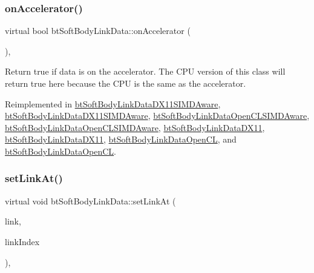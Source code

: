 \subsubsection{\texorpdfstring{on\+Accelerator()}{onAccelerator()}\hspace{0.1cm}{\footnotesize\ttfamily [2/2]}}
{\footnotesize\ttfamily virtual bool bt\+Soft\+Body\+Link\+Data\+::on\+Accelerator (\begin{DoxyParamCaption}{ }\end{DoxyParamCaption})\hspace{0.3cm}{\ttfamily [inline]}, {\ttfamily [virtual]}}

Return true if data is on the accelerator. The C\+PU version of this class will return true here because the C\+PU is the same as the accelerator. 

Reimplemented in \hyperlink{classbtSoftBodyLinkDataDX11SIMDAware_acc8a4475c093d0caf3da6e104ad33f5d}{bt\+Soft\+Body\+Link\+Data\+D\+X11\+S\+I\+M\+D\+Aware}, \hyperlink{classbtSoftBodyLinkDataDX11SIMDAware_a3e740fcbea59c3d0b79f27df3fe8c40d}{bt\+Soft\+Body\+Link\+Data\+D\+X11\+S\+I\+M\+D\+Aware}, \hyperlink{classbtSoftBodyLinkDataOpenCLSIMDAware_a5016c89bbdf9c87283c138d629f34601}{bt\+Soft\+Body\+Link\+Data\+Open\+C\+L\+S\+I\+M\+D\+Aware}, \hyperlink{classbtSoftBodyLinkDataOpenCLSIMDAware_a0b6e6e7c88ca01fcb83160bfec42ecbe}{bt\+Soft\+Body\+Link\+Data\+Open\+C\+L\+S\+I\+M\+D\+Aware}, \hyperlink{classbtSoftBodyLinkDataDX11_a3138e6cb78bf8dac4786a3c45b26d5b8}{bt\+Soft\+Body\+Link\+Data\+D\+X11}, \hyperlink{classbtSoftBodyLinkDataDX11_a97835c62006c461555d41c61af626f17}{bt\+Soft\+Body\+Link\+Data\+D\+X11}, \hyperlink{classbtSoftBodyLinkDataOpenCL_a3e97987329d5a5e7a4a51523fa9d4651}{bt\+Soft\+Body\+Link\+Data\+Open\+CL}, and \hyperlink{classbtSoftBodyLinkDataOpenCL_a6cd4ec2a4127d48feff5c2cb46be5d52}{bt\+Soft\+Body\+Link\+Data\+Open\+CL}.

\mbox{\label{classbtSoftBodyLinkData_a44f200dcb878405cebf3704dc7a8b8cd}} 
\subsubsection{\texorpdfstring{set\+Link\+At()}{setLinkAt()}\hspace{0.1cm}{\footnotesize\ttfamily [1/2]}}
{\footnotesize\ttfamily virtual void bt\+Soft\+Body\+Link\+Data\+::set\+Link\+At (\begin{DoxyParamCaption}\item[{const \hyperlink{classbtSoftBodyLinkData_1_1LinkDescription}{Link\+Description} \&}]{link,  }\item[{int}]{link\+Index }\end{DoxyParamCaption})\hspace{0.3cm}{\ttfamily [inline]}, {\ttfamily [virtual]}}

